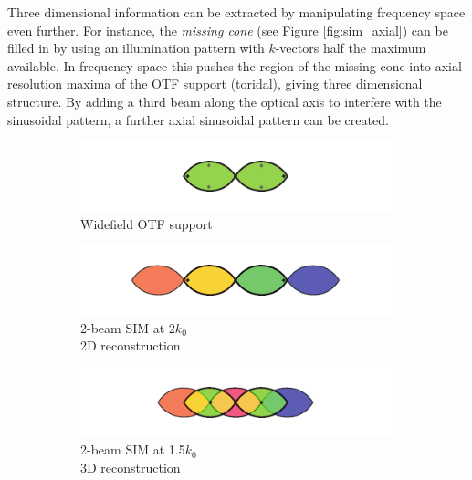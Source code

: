 Three dimensional information can be extracted by manipulating frequency space even further.
For instance, the \emph{missing cone} (see Figure \ref{fig:sim_axial}) can be filled in by using an illumination pattern with $k$-vectors half the maximum available.
In frequency space this pushes the region of the missing cone into axial resolution maxima of the OTF support (toridal), giving three dimensional structure.
By adding a third beam along the optical axis to interfere with the sinusoidal pattern, a further axial sinusoidal pattern can be created.
\begin{figure}
    \centering
    \begin{subfigure}[b]{0.48\textwidth}
        \centering
        \includegraphics{./sim/axial_otf}
        \caption{Widefield OTF support}
        \label{fig:sim_axial_otf}
    \end{subfigure}
    \begin{subfigure}[b]{0.48\textwidth}
        \centering
        \includegraphics{./sim/axial_2_beam_2d}
        \caption{2-beam SIM at \SI{2}{\times}$k_0$\\2D reconstruction}
        \label{fig:sim_axial_2_beam_2d}
    \end{subfigure}
    \begin{subfigure}[b]{0.48\textwidth}
        \centering
        \includegraphics{./sim/axial_2_beam_3d}
        \caption{2-beam SIM at \SI{1.5}{\times}$k_0$\\3D reconstruction}
        \label{fig:sim_axial_2_beam_3d}
    \end{subfigure}
    \begin{subfigure}[b]{0.48\textwidth}
        \centering

\end{subfigure}
\end{figure}
